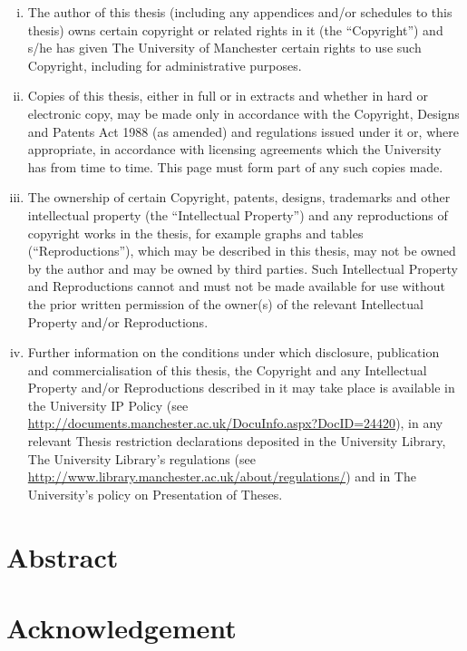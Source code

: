 \documentclass[11pt,oneside]{thesisformat}
\begin{document}
\begin{enumerate}[(i)]
\item The author of this thesis (including any appendices and/or schedules to this thesis) owns certain copyright or related rights in it (the  “Copyright”) and s/he has given The University of Manchester certain  rights to use such Copyright, including for administrative purposes.
\item Copies of this thesis, either in full or in extracts and whether in hard or electronic copy, may be made only in accordance with the Copyright, Designs and Patents Act 1988 (as  amended) and regulations issued under it or, where appropriate, in accordance with licensing agreements which the University has from time to time. This page must form part of any such copies made.
\item The ownership of certain Copyright, patents, designs, trademarks and other intellectual property (the “Intellectual Property”) and any reproductions of copyright works in the thesis, for example graphs and tables (“Reproductions”), which may be described in this thesis, may not be owned by the author and may be owned by third parties. Such Intellectual Property and Reproductions cannot and must not be made available for use without the prior written permission of the owner(s) of the relevant Intellectual Property and/or Reproductions.
\item Further information on the conditions under which disclosure, publication and commercialisation of this thesis, the Copyright and any Intellectual Property  and/or Reproductions described in it may take place is available in the University IP Policy (see \url{http://documents.manchester.ac.uk/DocuInfo.aspx?DocID=24420}), in any relevant Thesis restriction declarations deposited in the University Library, The University Library’s regulations (see \url{http://www.library.manchester.ac.uk/about/regulations/}) and in The University’s policy on Presentation of Theses.
\end{enumerate}

\chapter*{Abstract}

\chapter*{Acknowledgement}
\end{document}
